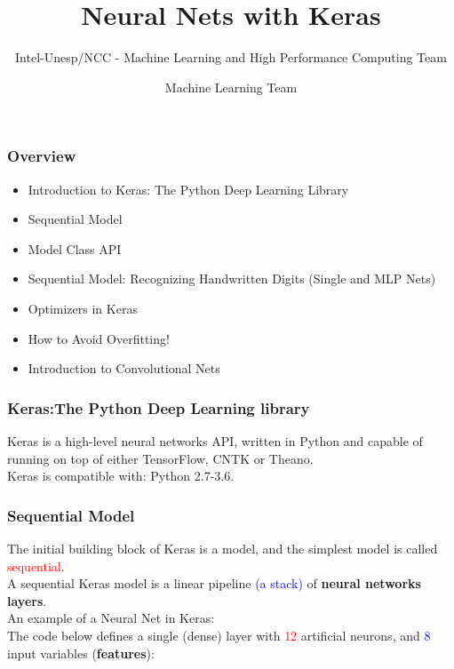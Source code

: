 \documentclass[aspectratio=169]{beamer}
\title[Short title]{Neural Nets with Keras}
\subtitle{Intel-Unesp/NCC - Machine Learning and High Performance Computing Team}
\author{Machine Learning Team}
\begin{document}
\begin{frame}
\titlepage 
\end{frame}

\begin{frame}
\frametitle{Overview} 
\begin{itemize}
\item Introduction to Keras: The Python Deep Learning Library
\item Sequential Model
\item Model Class API
\item Sequential Model: Recognizing Handwritten Digits (Single and MLP Nets)
\item Optimizers in Keras
\item How to Avoid Overfitting!
\item Introduction to Convolutional Nets
\end{itemize}
\end{frame}

\begin{frame}
\frametitle{Keras:The Python Deep Learning library}
Keras is a high-level neural networks API, written in Python and capable of running on top of either TensorFlow, CNTK or Theano.
\\[0.5cm]
Keras is compatible with: Python 2.7-3.6.
\end{frame}

\begin{frame}
\frametitle{Sequential Model}
The initial building block of Keras is a model, and the simplest model is called \textcolor{red}{sequential}. 
\\[0.6cm]
A sequential Keras model is a linear pipeline \textcolor{blue}{(a stack)} of \textbf{neural networks layers}.
\\[0.6cm]
An example of a Neural Net in Keras:
\\[0.3cm]
The code below defines a single (dense) layer with \textcolor{red}{12} artificial neurons, and \textcolor{blue}{8} input variables (\textbf{features}):
\\[0.3cm]
\inputminted{python}{/aux_files/one.py}
\end{frame}
\end{document}
